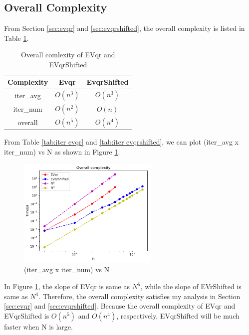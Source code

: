 \documentclass{article}
\begin{document}
\subsection{Overall Complexity}
From Section \ref{sec:evqr} and \ref{sec:evqrshifted}, the overall complexity is listed in Table \ref{tab:overall}.
\begin{table}[H]
    \begin{center}
        \begin{tabular}{|c|c|c|}
            \hline
             Complexity & Evqr & EvqrShifted \\ \hline
             iter\_avg & $O(n^3)$ & $O(n^3)$ \\ \hline
             iter\_num & $O(n^2)$ & $O(n)$ \\ \hline
             overall & $O(n^5)$ & $O(n^4)$ \\ \hline
        \end{tabular}
    \end{center}
    \caption{Overall comlexity of EVqr and EVqrShifted}
    \label{tab:overall}
\end{table}
From Table \ref{tab:iter evqr} and \ref{tab:iter evqrshifted}, we can plot (iter\_avg x iter\_num) vs N as shown in Figure \ref{fig:overall}.
\begin{figure}[H]
    \centering
    \includegraphics[width=0.6\textwidth]{src/overall.pdf}
    \caption{(iter\_avg x iter\_num) vs N}
    \label{fig:overall}
\end{figure}
In Figure \ref{fig:overall}, the slope of EVqr is same as $N^5$, while the slope of EVrShifted is same as $N^4$. Therefore, the overall complexity
satisfies my analysis in Section \ref{sec:evqr} and \ref{sec:evqrshifted}. \newline
Because the overall complexity of EVqr and EVqrShifted is {\boldmath$O(n^5)$ and $O(n^4)$}, respectively, EVqrShifted will be much faster when
N is large.
\end{document}
